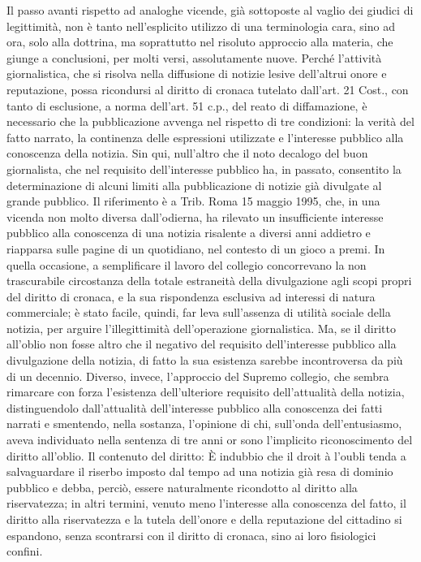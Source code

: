 Il passo avanti rispetto ad analoghe vicende, già sottoposte al vaglio dei giudici di legittimità, non è tanto nell’esplicito utilizzo di una terminologia cara, sino ad ora, solo alla dottrina, ma soprattutto nel risoluto approccio alla materia, che giunge a conclusioni, per molti versi, assolutamente nuove.
Perché l’attività giornalistica, che si risolva nella diffusione di notizie lesive dell’altrui onore e reputazione, possa ricondursi al diritto di cronaca tutelato dall’art. 21 Cost., con tanto di esclusione, a norma dell’art. 51 c.p., del reato di diffamazione, è necessario che la pubblicazione avvenga nel rispetto di tre condizioni: la verità del fatto narrato, la continenza delle espressioni utilizzate e l’interesse pubblico alla conoscenza della notizia. Sin qui, null’altro che il noto decalogo del buon giornalista, che nel requisito dell’interesse pubblico ha, in passato, consentito la determinazione di alcuni limiti alla pubblicazione di notizie già divulgate al grande pubblico.
Il riferimento è a Trib. Roma 15 maggio 1995, che, in una vicenda non molto diversa dall’odierna, ha rilevato un insufficiente interesse pubblico alla conoscenza di una notizia risalente a diversi anni addietro e riapparsa sulle pagine di un quotidiano, nel contesto di un gioco a premi.
In quella occasione, a semplificare il lavoro del collegio concorrevano la non trascurabile circostanza della totale estraneità della divulgazione agli scopi propri del diritto di cronaca, e la sua rispondenza esclusiva ad interessi di natura commerciale; è stato facile, quindi, far leva sull’assenza di utilità sociale della notizia, per arguire l’illegittimità dell’operazione giornalistica.
Ma, se il diritto all’oblio non fosse altro che il negativo del requisito dell’interesse pubblico alla divulgazione della notizia, di fatto la sua esistenza sarebbe incontroversa da più di un decennio.
Diverso, invece, l’approccio del Supremo collegio, che sembra rimarcare con forza l’esistenza dell’ulteriore requisito dell’attualità della notizia, distinguendolo dall’attualità dell’interesse pubblico alla conoscenza dei fatti narrati e smentendo, nella sostanza, l’opinione di chi, sull’onda dell’entusiasmo, aveva individuato nella sentenza di tre anni or sono l’implicito riconoscimento del diritto all’oblio.
Il contenuto del diritto: È indubbio che il droit à l’oubli tenda a salvaguardare il riserbo imposto dal tempo ad una notizia già resa di dominio pubblico e debba, perciò, essere naturalmente ricondotto al diritto alla riservatezza; in altri termini, venuto meno l’interesse alla conoscenza del fatto, il diritto alla riservatezza e la tutela dell’onore e della reputazione del cittadino si espandono, senza scontrarsi con il diritto di cronaca, sino ai loro fisiologici confini.
